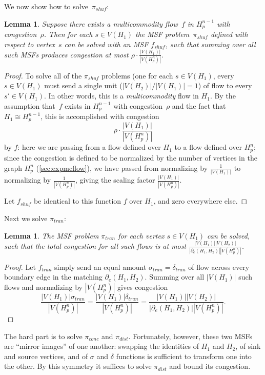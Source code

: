 \documentclass[
final
]{dmtcs-episciences}
\newcommand{\edgeh}[2]{\partial_e(#1,#2)}
\newtheorem{lemma}[theorem]{Lemma}
\begin{document}
We now show how to solve~$\pi_{shuf}$:

\begin{lemma}
\label{lem:pishufcong}
Suppose there exists a multicommodity flow~$f$ in $H_p^{n-1}$ with congestion~$\rho$. Then for each $s \in V(H_1)$ the MSF problem~$\pi_{shuf}$ defined with respect to vertex~$s$ can be solved with an MSF $f_{shuf}$, such that summing over all such MSFs produces congestion at most $\rho\cdot \frac{|V(H_1)|}{|V\left(H_p^n\right)|}$.
\end{lemma}
\begin{proof}
To solve all of the $\pi_{shuf}$ problems (one for each $s \in V(H_1)$, every $s \in V(H_1)$ must send a single unit ($|V(H_2)|/|V(H_1)| = 1$) of flow to every $s' \in V(H_1)$. In other words, this is a \emph{multicommodity} flow in $H_1$. By the assumption that~$f$ exists in $H_p^{n-1}$ with congestion~$\rho$ and the fact that $H_1 \cong H_p^{n-1}$, this is accomplished with congestion
\[\rho\cdot \frac{|V(H_1)|}{|V(H_p^n)|}\]
by $f$: here we are passing from a flow defined over $H_1$ to a flow defined over $H_p^n$; since the congestion is defined to be normalized by the number of vertices in the graph $H_p^n$ (\cref{sec:expmcflow}), we have passed from normalizing by $\frac{1}{|V(H_1)|}$ to normalizing by $\frac{1}{|V(H_p^n)|}$, giving the scaling factor $\frac{|V(H_1)|}{|V(H_p^n)|}$.

Let $f_{shuf}$ be identical to this function $f$ over $H_1$, and zero everywhere else.
\end{proof}

Next we solve $\pi_{tran}$:
\begin{lemma}
    The MSF problem $\pi_{tran}$ for each vertex $s\in V(H_1)$ can be solved, such that the total congestion for all such flows is at most $\frac{|V(H_1)||V(H_2)|}{|\edgeh{H_1}{H_2}||V(H_p^n)|}$.
\end{lemma}
\begin{proof}
Let $f_{tran}$ simply send an equal amount $\sigma_{tran} = \delta_{tran}$ of flow across every boundary edge in the matching $\edgeh{H_1}{H_2}$. Summing over all $|V(H_1)|$ such flows and normalizing by $|V(H_p^n)|$ gives congestion
\[
    \frac{|V(H_1)|\sigma_{tran}}{|V(H_p^n)|} = \frac{|V(H_1)|\delta_{tran}}{|V(H_p^n)|} = \frac{|V(H_1)||V(H_2)|}{|\edgeh{H_1}{H_2}||V(H_p^n)|}.
\]
\end{proof}

The hard part is to solve $\pi_{conc}$ and $\pi_{dist}$. Fortunately, however, these two MSFs are ``mirror images'' of one another: swapping the identities of $H_1$ and $H_2$, of sink and source vertices, and of $\sigma$ and $\delta$ functions is sufficient to transform one into the other. By this symmetry it suffices to solve $\pi_{dist}$ and bound its congestion.
\end{document}
